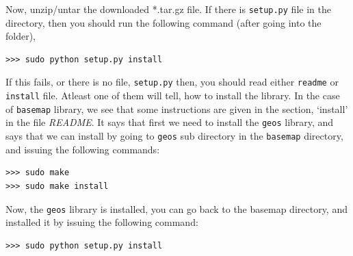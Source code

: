 \documentclass[10pt]{book}
\begin{document}
Now, unzip/untar the downloaded *.tar.gz file. If there is \verb"setup.py" file in the directory, then you should run the following command (after going into the folder),
\beforeverb \begin{verbatim}
>>> sudo python setup.py install
\end{verbatim} \afterverb


If this fails, or there is no file, \verb"setup.py" then, you should read either \verb"readme" or \verb"install" file. Atleast one of them will tell, how to install the library. In the case of \verb"basemap" library, we see that some instructions are given in the section, `install' in the file \emph{README}. It says that first we need to install the \verb"geos" library, and says that we can install by going to \verb"geos" sub directory in the \verb"basemap" directory, and issuing the following commands:

\beforeverb \begin{verbatim}
>>> sudo make
>>> sudo make install
\end{verbatim} \afterverb

Now, the \verb"geos" library is installed, you can go back to the basemap directory, and installed it by issuing the following command:

\beforeverb \begin{verbatim}
>>> sudo python setup.py install
\end{verbatim} \afterverb

\printindex
\end{document}
